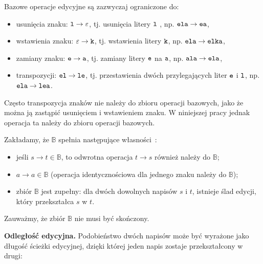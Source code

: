 \documentclass{praca1}
\begin{document}
Bazowe operacje edycyjne są zazwyczaj ograniczone do:
\begin{itemize}
\item usunięcia znaku: $\verb|l| \rightarrow \varepsilon$, tj. usunięcia litery $\verb|l|$ , np. $\verb|ela| \rightarrow \verb|ea|$,
\item wstawienia znaku: $\varepsilon \rightarrow \verb|k|$, tj. wstawienia litery $\verb|k|$, np. $\verb|ela| \rightarrow \verb|elka|$,
\item zamiany znaku: $\verb|e| \rightarrow \verb|a|$, tj. zamiany litery $\verb|e|$ na $\verb|a|$, np. $\verb|ala| \rightarrow \verb|ela|$,
\item transpozycji: $\verb|el| \rightarrow \verb|le|$, tj. przestawienia dwóch przylegających liter $\verb|e|$ i $\verb|l|$, np. $\verb|ela| \rightarrow \verb|lea|$.
\end{itemize}

Często transpozycja znaków nie należy do zbioru operacji bazowych, jako że można ją zastąpić usunięciem i wstawieniem znaku. W niniejszej pracy jednak operacja ta należy do zbioru operacji bazowych.


\begin{property}\label{wl:001}
Zakładamy, że $\mathbb{B}$ spełnia następujące własności~\cite{Boytsov2011:indexingmethods}:
\begin{itemize}
\item jeśli $s \rightarrow t \in \mathbb{B}$, to odwrotna operacja $t \rightarrow s$ również należy do $\mathbb{B}$;
\item $a \rightarrow a \in \mathbb{B}$ (operacja identycznościowa dla jednego znaku należy do $\mathbb{B}$);
\item zbiór $\mathbb{B}$ jest zupełny: dla dwóch dowolnych napisów $s$ i $t$, istnieje ślad edycji, który przekształca $s$ w $t$.
\end{itemize}
\end{property}

Zauważmy, że zbiór $\mathbb{B}$ nie musi być skończony.

\textbf{Odległość edycyjna.} Podobieństwo dwóch napisów może być wyrażone jako długość ścieżki edycyjnej, dzięki której jeden napis zostaje przekształcony w drugi:
\end{document}
